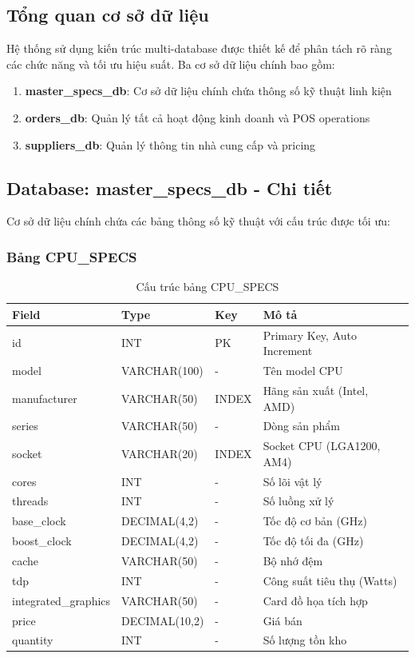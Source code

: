 \documentclass[12pt,a4paper]{article}
\begin{document}
\subsection{Tổng quan cơ sở dữ liệu}
Hệ thống sử dụng kiến trúc multi-database được thiết kế để phân tách rõ ràng các chức năng và tối ưu hiệu suất. Ba cơ sở dữ liệu chính bao gồm:

\begin{enumerate}
    \item \textbf{master\_specs\_db}: Cơ sở dữ liệu chính chứa thông số kỹ thuật linh kiện
    \item \textbf{orders\_db}: Quản lý tất cả hoạt động kinh doanh và POS operations
    \item \textbf{suppliers\_db}: Quản lý thông tin nhà cung cấp và pricing
\end{enumerate}

\subsection{Database: master\_specs\_db - Chi tiết}
Cơ sở dữ liệu chính chứa các bảng thông số kỹ thuật với cấu trúc được tối ưu:

\subsubsection{Bảng CPU\_SPECS}
\begin{table}[H]
\centering
\begin{tabular}{@{}llll@{}}
\toprule
\textbf{Field} & \textbf{Type} & \textbf{Key} & \textbf{Mô tả} \\
\midrule
id & INT & PK & Primary Key, Auto Increment \\
model & VARCHAR(100) & - & Tên model CPU \\
manufacturer & VARCHAR(50) & INDEX & Hãng sản xuất (Intel, AMD) \\
series & VARCHAR(50) & - & Dòng sản phẩm \\
socket & VARCHAR(20) & INDEX & Socket CPU (LGA1200, AM4) \\
cores & INT & - & Số lõi vật lý \\
threads & INT & - & Số luồng xử lý \\
base\_clock & DECIMAL(4,2) & - & Tốc độ cơ bản (GHz) \\
boost\_clock & DECIMAL(4,2) & - & Tốc độ tối đa (GHz) \\
cache & VARCHAR(50) & - & Bộ nhớ đệm \\
tdp & INT & - & Công suất tiêu thụ (Watts) \\
integrated\_graphics & VARCHAR(50) & - & Card đồ họa tích hợp \\
price & DECIMAL(10,2) & - & Giá bán \\
quantity & INT & - & Số lượng tồn kho \\
\bottomrule
\end{tabular}
\caption{Cấu trúc bảng CPU\_SPECS}
\end{table}
\end{document}
